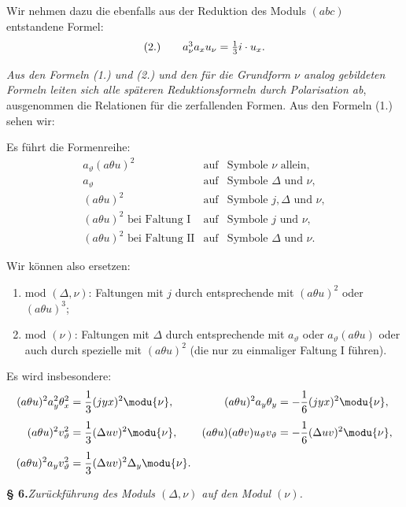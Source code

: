 Wir nehmen dazu die ebenfalls aus der Reduktion des Moduls $(abc)$ entstandene Formel:
\[
\begin{array}{r@{\qquad}l}
(2.) & a_\nu^3a_xu_\nu=\frac13i\cdot u_x.
\end{array}
\]

\emph{Aus den Formeln (1.) und (2.) und den für die Grundform $\nu$ analog gebildeten Formeln leiten sich alle späteren Reduktionsformeln durch Polarisation ab}, ausgenommen die Relationen für die zerfallenden Formen. Aus den Formeln (1.) sehen wir:

Es führt die Formenreihe:
\[
\begin{array}{rcl}
a_\vartheta(a\theta u)^2 &\text{auf}& \text{Symbole }\nu\text{ allein},\\[0.2em]
a_\vartheta &\text{auf}& \text{Symbole }\Delta\text{ und }\nu,\\[0.2em]
(a\theta u)^2 &\text{auf}& \text{Symbole }j,\Delta\text{ und }\nu,\\[0.2em]
(a\theta u)^2\text{ bei Faltung I} &\text{auf}& \text{Symbole }j\text{ und }\nu,\\[0.2em]
(a\theta u)^2\text{ bei Faltung II} &\text{auf}& \text{Symbole }\Delta\text{ und }\nu.
\end{array}
\]

Wir können also ersetzen:
\begingroup
\renewcommand{\labelenumi}{\arabic{enumi})}
\begin{enumerate}
\item mod $(\Delta,\nu)$: Faltungen mit $j$ durch entsprechende mit $(a\theta u)^2$ oder $(a\theta u)^3$;
\item mod $(\nu)$: Faltungen mit $\Delta$ durch entsprechende mit $a_\vartheta$ oder $a_\vartheta(a\theta u)$ oder auch durch spezielle mit $(a\theta u)^2$ (die nur zu einmaliger Faltung I führen).
\end{enumerate}
\endgroup
Es wird insbesondere:
\[
\begin{aligned}
(a\theta u)^2a_y^2\theta_x^2&=\frac13(jyx)^2\modu{\nu},&
(a\theta u)^2a_y\theta_y&=-\frac16(jyx)^2\modu{\nu},\\[0.4em]
(a\theta u)^2v_\vartheta^2&=\frac13(\Delta uv)^2\modu{\nu},&
(a\theta u)(a\theta v)u_\vartheta v_\vartheta&=-\frac16(\Delta uv)^2\modu{\nu},\\[0.4em]
(a\theta u)^2a_yv_\vartheta^2&=\frac13(\Delta uv)^2\Delta_y\modu{\nu}.
\end{aligned}
\]

\begin{center}
\textbf{§ 6.}\quad\emph{Zurückführung des Moduls $(\Delta,\nu)$ auf den Modul $(\nu)$.}
\end{center}

